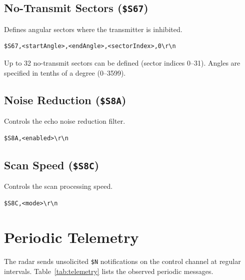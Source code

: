\documentclass[11pt,letterpaper]{article}
\begin{document}
\subsection{No-Transmit Sectors (\texttt{\$S67})}

Defines angular sectors where the transmitter is inhibited.

\begin{lstlisting}
$S67,<startAngle>,<endAngle>,<sectorIndex>,0\r\n
\end{lstlisting}

Up to 32 no-transmit sectors can be defined (sector indices 0--31). Angles are specified in tenths of a degree (0--3599).


\subsection{Noise Reduction (\texttt{\$S8A})}

Controls the echo noise reduction filter.

\begin{lstlisting}
$S8A,<enabled>\r\n
\end{lstlisting}


\subsection{Scan Speed (\texttt{\$S8C})}

Controls the scan processing speed.

\begin{lstlisting}
$S8C,<mode>\r\n
\end{lstlisting}


\section{Periodic Telemetry}

The radar sends unsolicited \texttt{\$N} notifications on the control channel at regular intervals. Table~\ref{tab:telemetry} lists the observed periodic messages.
\end{document}
